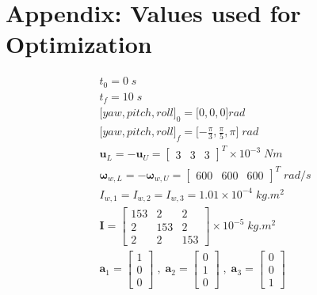 \documentclass[letterpaper, paper,11pt]{AAS}		%
\begin{document}
\section{Appendix: Values used for Optimization}
\begin{align*}
t_{0} = 0 \; s \\
t_{f} = 10 \; s \\
\lbrack yaw, pitch, roll\rbrack_{0} = \lbrack 0, 0, 0\rbrack rad \\
\lbrack yaw, pitch, roll\rbrack_{f} = \lbrack -\frac{\pi}{3}, \frac{\pi}{5}, \pi \rbrack \; rad \\
\pmb{u}_{L} = -\pmb{u}_{U} = \begin{bmatrix}3 & 3 & 3 \end{bmatrix}^{T} \times 10^{-3} \; Nm \\
\pmb{\omega}_{w,L} = -\pmb{\omega}_{w,U} = \begin{bmatrix} 600 & 600& 600 \end{bmatrix}^{T} \; rad/s \\
I_{w,1} = I_{w,2} = I_{w,3} = 1.01 \times 10^{-4} \; kg. m^{2} \\
\pmb{I} = \begin{bmatrix}
153 & 2 & 2 \\
2 & 153 & 2 \\
2 & 2 & 153
\end{bmatrix} \times 10^{-5} \; kg. m^{2}\\
\pmb{a}_1 = \begin{bmatrix}
1 \\ 0 \\ 0
\end{bmatrix} \; , \;
\pmb{a}_2 = \begin{bmatrix}
0 \\ 1 \\ 0
\end{bmatrix} \; , \;
\pmb{a}_3 = \begin{bmatrix}
0 \\ 0 \\ 1
\end{bmatrix} \;\\
\end{align*}


\end{document}
